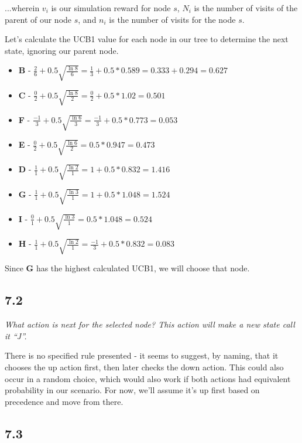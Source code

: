 \documentclass{article}
\begin{document}
...wherein $v_i$ is our simulation reward for node $s$, $N_i$ is the number of visits of the parent of our node $s$, and $n_i$ is the number of visits for the node $s$.

Let's calculate the UCB1 value for each node in our tree to determine the next state, ignoring our parent node.

\begin{itemize}
    \item \textbf{B} - $\frac{2}{6}+ 0.5 \sqrt{\frac{\ln{8}}{6}} = \frac{1}{3} + 0.5 * 0.589 = 0.333 + 0.294 = 0.627$
    \item \textbf{C} - $\frac{0}{2}+ 0.5 \sqrt{\frac{\ln{8}}{2}} = \frac{0}{2} + 0.5 * 1.02 = 0.501$
    \item \textbf{F} - $\frac{-1}{3}+ 0.5 \sqrt{\frac{\ln{6}}{3}} = \frac{-1}{3} + 0.5 * 0.773 = 0.053$
    \item \textbf{E} - $\frac{0}{2}+ 0.5 \sqrt{\frac{\ln{6}}{2}} = 0.5 * 0.947 = 0.473$
    \item \textbf{D} - $\frac{1}{1}+ 0.5 \sqrt{\frac{\ln{2}}{1}} = 1 + 0.5 * 0.832 = 1.416$
    \item \textbf{G} - $\frac{1}{1}+ 0.5 \sqrt{\frac{\ln{3}}{1}} = 1 + 0.5 * 1.048 = 1.524$
    \item \textbf{I} - $\frac{0}{1}+ 0.5 \sqrt{\frac{\ln{3}}{1}} = 0.5 * 1.048 = 0.524$
    \item \textbf{H} - $\frac{1}{1}+ 0.5 \sqrt{\frac{\ln{2}}{1}} = \frac{-1}{3} + 0.5 * 0.832 = 0.083$
\end{itemize}

Since \textbf{G} has the highest calculated UCB1, we will choose that node.

\subsection*{7.2}

\textit{What action is next for the selected node? This action will make a new state call it “J”.}

There is no specified rule presented - it seems to suggest, by naming, that it chooses the up action first, then later checks the down action. This could also occur in a random choice, which would also work if both actions had equivalent probability in our scenario. For now, we'll assume it's up first based on precedence and move from there.

\subsection*{7.3}
\end{document}
